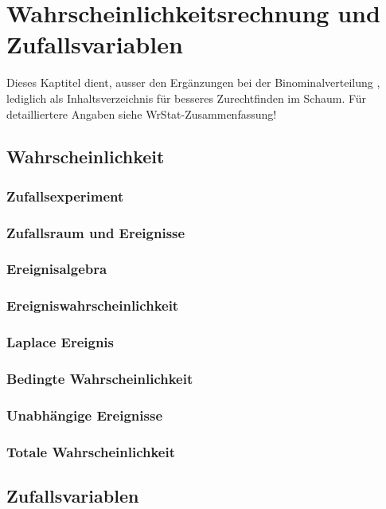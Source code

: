 \section{Wahrscheinlichkeitsrechnung und Zufallsvariablen }
Dieses Kaptitel dient, ausser den Ergänzungen bei der Binominalverteilung
 \normalsize, lediglich als Inhaltsverzeichnis für besseres
Zurechtfinden im Schaum.
Für detailliertere Angaben siehe WrStat-Zusammenfassung!
\vspace{-0.3cm}
\subsection{Wahrscheinlichkeit }
\subsubsection{Zufallsexperiment }
\subsubsection{Zufallsraum und Ereignisse }
\subsubsection{Ereignisalgebra }
\subsubsection{Ereigniswahrscheinlichkeit }
\subsubsection{Laplace Ereignis }
\subsubsection{Bedingte Wahrscheinlichkeit }
\subsubsection{Unabhängige Ereignisse }
\subsubsection{Totale Wahrscheinlichkeit }
\vspace{0.25cm}

\subsection{Zufallsvariablen }
